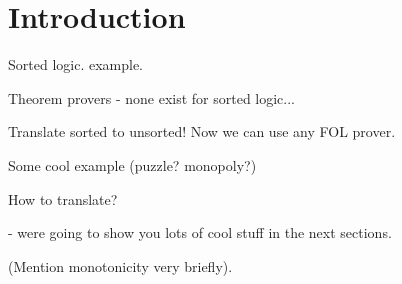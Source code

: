 
\section{Introduction}

Sorted logic. example.

Theorem provers - none exist for sorted logic...

Translate sorted to unsorted! Now we can use any FOL prover.

Some cool example (puzzle? monopoly?)

How to translate?

- were going to show you lots of cool stuff in the next sections.

(Mention monotonicity very briefly).












